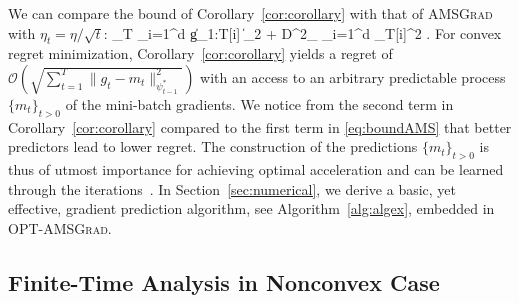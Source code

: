 \documentclass[twoside]{article}
\begin{document}
We can compare the bound of Corollary~\ref{cor:corollary} with that of \textsc{AMSGrad} \citep{RKK18} with $\eta_t = \eta/\sqrt{t}$:
\beq\label{eq:boundAMS}
_T \leq {} \sum_{i=1}^d \| g_{1:T}[i]  \|_2 + D^2_{\infty} \sum_{i=1}^d _T[i]^2 \eqsp.
\eeq
For convex regret minimization, Corollary~\ref{cor:corollary} yields a regret of $\mathcal{O}(\sqrt{\sum_{t=1}^T \| g_t - m_t  \|^2_{\psi^*_{t-1}}})$ with an access to an arbitrary predictable process $\{m_t\}_{t>0}$ of the mini-batch gradients.
We notice from the second term in Corollary~\ref{cor:corollary} compared to the first term in \eqref{eq:boundAMS} that better predictors lead to lower regret.
The construction of the predictions $\{m_t\}_{t>0}$ is thus of utmost importance for achieving optimal acceleration and can be learned through the iterations~\citep{RS13b}.
In Section~\ref{sec:numerical}, we derive a basic, yet effective, gradient prediction algorithm, see Algorithm~\ref{alg:algex}, embedded in \textsc{OPT-AMSGrad}.

\subsection{Finite-Time Analysis in  Nonconvex Case}
\end{document}
